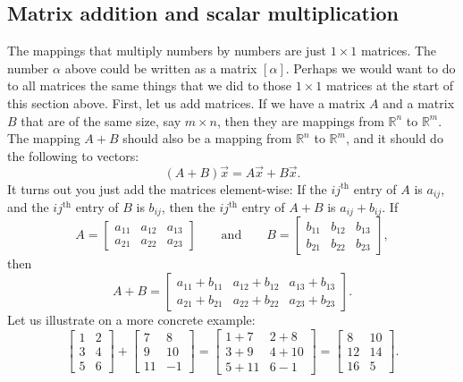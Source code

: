 \subsection{Matrix addition and scalar multiplication}

The mappings that multiply numbers by numbers are just $1 \times 1$ matrices.  The
number $\alpha$ above could be written as a matrix $[\alpha]$.
Perhaps we would want to do to all matrices the same things that we
did to those $1 \times 1$ matrices at the start of this section above.
First, let us add matrices.
If we have a matrix $A$ and a matrix $B$ that are of the same size,
say $m \times n$, then they are mappings from
${\mathbb{R}}^n$ to ${\mathbb{R}}^m$.  The mapping $A+B$ should also be a mapping from
${\mathbb{R}}^n$ to ${\mathbb{R}}^m$, and it should do the following to
vectors:
\begin{equation*}
(A+B) \vec{x} = A\vec{x} + B \vec{x} .
\end{equation*}
It turns out you just add the matrices element-wise:  If the
$ij^{\text{th}}$ entry of $A$ is $a_{ij}$, and the
$ij^{\text{th}}$ entry of $B$ is $b_{ij}$, then the
$ij^{\text{th}}$ entry of $A+B$ is $a_{ij} + b_{ij}$.  If
\begin{equation*}
A = 
\begin{bmatrix}
a_{11} & a_{12} & a_{13}  \\
a_{21} & a_{22} & a_{23}
\end{bmatrix}
\qquad \text{and} \qquad
B = 
\begin{bmatrix}
b_{11} & b_{12} & b_{13}  \\
b_{21} & b_{22} & b_{23}
\end{bmatrix} ,
\end{equation*}
then
\begin{equation*}
A+B = 
\begin{bmatrix}
a_{11} + b_{11} & a_{12} + b_{12} & a_{13} + b_{13}  \\
a_{21} + b_{21} & a_{22} + b_{22} & a_{23} + b_{23}
\end{bmatrix} .
\end{equation*}
Let us illustrate on a more concrete example:
\begin{equation*}
\begin{bmatrix}
1 & 2 \\
3 & 4 \\
5 & 6
\end{bmatrix}
+
\begin{bmatrix}
7 & 8 \\
9 & 10 \\
11 & -1
\end{bmatrix}
=
\begin{bmatrix}
1+7 & 2+8 \\
3+9 & 4+10 \\
5+11 & 6-1
\end{bmatrix}
=
\begin{bmatrix}
8 & 10 \\
12 & 14 \\
16 & 5
\end{bmatrix} .
\end{equation*}
